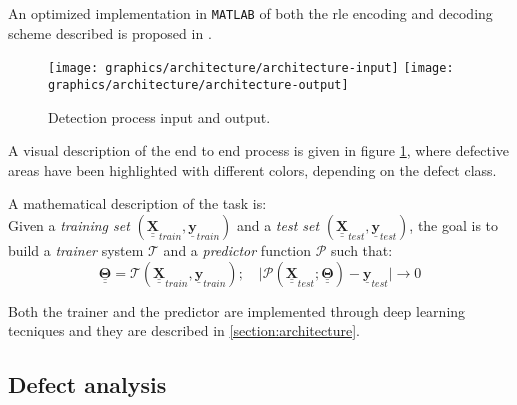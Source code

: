         \par{
            An optimized implementation in \texttt{MATLAB} of both the rle encoding and decoding scheme described is proposed in \cite{antonioterpin:github}.
        }
        \begin{figure}
            \texttt{[image: graphics/architecture/architecture-input]}
            \texttt{[image: graphics/architecture/architecture-output]}
            \caption{Detection process input and output.}\label{fig:exampledetection}
        \end{figure}
        \par{
            A visual description of the end to end process is given in figure \ref{fig:exampledetection}, where defective areas have been highlighted with different colors, depending on the defect class.
        }
        \par{
            A mathematical description of the task is:\\
            Given a \emph{training set} $\left(\underline{\underline{\mathbf{X}}}_{train}, \underline{\mathbf{y}}_{train}\right)$ and a \emph{test set} $\left(\underline{\underline{\mathbf{X}}}_{test}, \underline{\mathbf{y}}_{test}\right)$, the goal is to build a \emph{trainer} system $\mathcal{T}$ and a \emph{predictor} function $\mathcal{P}$ such that:
            \begin{equation*}
                \underline{\underline{\mathbf{\Theta}}} = \mathcal{T}\left(\underline{\underline{\mathbf{X}}}_{train}, \underline{\mathbf{y}}_{train}\right);\quad \lvert \mathcal{P}\left(\underline{\underline{\mathbf{X}}}_{test}; \underline{\underline{\mathbf{\Theta}}}\right) - \underline{\mathbf{y}}_{test} \rvert \rightarrow 0
            \end{equation*}
        }
        \par{
            Both the trainer and the predictor are implemented through deep learning tecniques and they are described in \ref{section:architecture}.
        }

    \subsection{Defect analysis}\label{subsection:defects}
